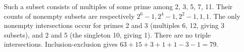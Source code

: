 Such a subset consists of multiples of some prime among 2, 3, 5, 7, 11. Their counts of nonempty subsets are respectively $2^6-1,2^4-1,2^2-1,1,1$. The only nonempty intersections occur for primes 2 and 3 (multiples 6, 12, giving 3 subsets), and 2 and 5 (the singleton 10, giving 1). There are no triple intersections. Inclusion-exclusion gives $63+15+3+1+1-3-1=\boxed{79}$.
